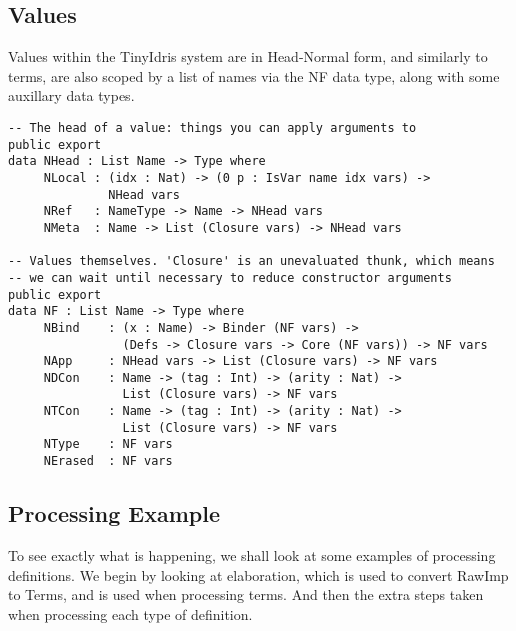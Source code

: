 \documentclass[a4paper]{article}
\begin{document}
\subsection{Values}
\label{sec:org5420ec7}
   Values within the TinyIdris system are in Head-Normal form, and 
similarly to terms, are also scoped by a list of names via the NF data
type, along with some auxillary data types. 

\begin{center}
\begin{verbatim}
-- The head of a value: things you can apply arguments to
public export
data NHead : List Name -> Type where
	 NLocal : (idx : Nat) -> (0 p : IsVar name idx vars) ->
			  NHead vars
	 NRef   : NameType -> Name -> NHead vars
	 NMeta  : Name -> List (Closure vars) -> NHead vars

-- Values themselves. 'Closure' is an unevaluated thunk, which means
-- we can wait until necessary to reduce constructor arguments
public export
data NF : List Name -> Type where
	 NBind    : (x : Name) -> Binder (NF vars) ->
				(Defs -> Closure vars -> Core (NF vars)) -> NF vars
	 NApp     : NHead vars -> List (Closure vars) -> NF vars
	 NDCon    : Name -> (tag : Int) -> (arity : Nat) ->
				List (Closure vars) -> NF vars
	 NTCon    : Name -> (tag : Int) -> (arity : Nat) ->
				List (Closure vars) -> NF vars
	 NType    : NF vars
	 NErased  : NF vars
\end{verbatim}
\end{center}
\subsection{Processing Example}
\label{sec:org4985236}
To see exactly what is happening, we shall look at some examples of 
processing definitions. We begin by looking at elaboration, which is 
used to convert RawImp to Terms, and is used when processing terms. 
And then the extra steps taken when processing each type of definition. 
\end{document}
